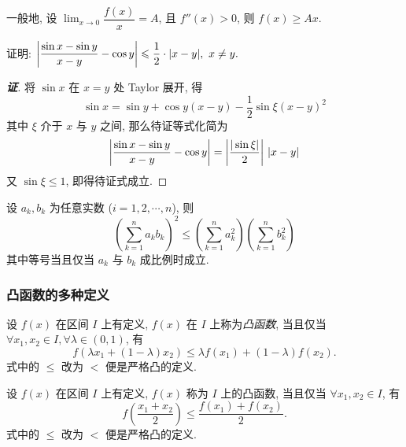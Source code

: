 \begin{inference}
    一般地, 设 $\displaystyle\lim_{x\to0}\dfrac{f(x)}{x}=A$, 且 $f''(x)>0$, 则 $f(x)\geqslant Ax.$
\end{inference}

\begin{example}
    证明: $\qty|\dfrac{\sin x-\sin y}{x-y}-\cos y|\leqslant \dfrac{1}{2}\cdot |x-y|,~x\neq y.$
\end{example}
\begin{proof}[{\songti \textbf{证}}]
    将 $\sin x$ 在 $x=y$ 处 Taylor 展开, 得 $$\sin x=\sin y+\cos y(x-y)-\dfrac{1}{2}\sin \xi(x-y)^2$$
    其中 $\xi$ 介于 $x$ 与 $y$ 之间, 那么待证等式化简为 $$\qty|\dfrac{\sin x-\sin y}{x-y}-\cos y|=\qty|\dfrac{|\sin\xi|}{2}|~|x-y|$$
    又 $\sin \xi\leqslant 1$, 即得待证式成立.
\end{proof}

\begin{theorem}
    设 $a_k,b_k$ 为任意实数 ($i=1,2,\cdots,n$), 则
    $$\displaystyle\left( \sum_{k=1}^n a_k b_k \right)^{\!\!2}\leqslant\left( \sum_{k=1}^n a_k^2 \right) \left( \sum_{k=1}^n b_k^2 \right) $$
    其中等号当且仅当 $a_k$ 与 $b_k$ 成比例时成立.
\end{theorem}

\subsubsection{凸函数的多种定义}

\begin{definition}[凸函数 A]
    设 $ f(x) $ 在区间 $ I $ 上有定义, $f(x) $ 在 $ I $ 上称为\textit{凸函数}, 当且仅当 $ \forall x_{1} ,  x_{2} \in I, \forall \lambda \in(0,1)$, 有
    $$f\left(\lambda x_{1}+(1-\lambda) x_{2}\right) \leqslant \lambda f\left(x_{1}\right)+(1-\lambda) f\left(x_{2}\right) .$$
    式中的 $\leqslant$ 改为 $<$ 便是严格凸的定义.
\end{definition}

\begin{definition}[凸函数 B]
    设 $ f(x) $ 在区间 $ I $ 上有定义, $f(x)$ 称为 $ I $ 上的凸函数, 当且仅当 $ \forall x_{1} ,  x_{2} \in I$, 有
    $$f\left(\frac{x_{1}+x_{2}}{2}\right) \leqslant \frac{f\left(x_{1}\right)+f\left(x_{2}\right)}{2} .$$
    式中的 $\leqslant$ 改为 $<$ 便是严格凸的定义.
\end{definition}

